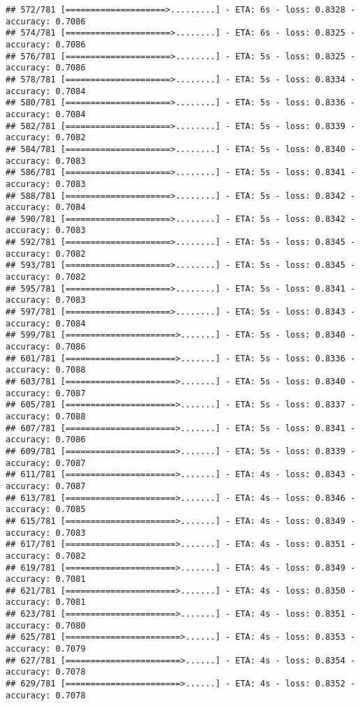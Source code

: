 \documentclass[
]{article}
\begin{document}
\begin{verbatim}
## 572/781 [====================>.........] - ETA: 6s - loss: 0.8328 - accuracy: 0.7086
## 574/781 [=====================>........] - ETA: 6s - loss: 0.8325 - accuracy: 0.7086
## 576/781 [=====================>........] - ETA: 5s - loss: 0.8325 - accuracy: 0.7086
## 578/781 [=====================>........] - ETA: 5s - loss: 0.8334 - accuracy: 0.7084
## 580/781 [=====================>........] - ETA: 5s - loss: 0.8336 - accuracy: 0.7084
## 582/781 [=====================>........] - ETA: 5s - loss: 0.8339 - accuracy: 0.7082
## 584/781 [=====================>........] - ETA: 5s - loss: 0.8340 - accuracy: 0.7083
## 586/781 [=====================>........] - ETA: 5s - loss: 0.8341 - accuracy: 0.7083
## 588/781 [=====================>........] - ETA: 5s - loss: 0.8342 - accuracy: 0.7084
## 590/781 [=====================>........] - ETA: 5s - loss: 0.8342 - accuracy: 0.7083
## 592/781 [=====================>........] - ETA: 5s - loss: 0.8345 - accuracy: 0.7082
## 593/781 [=====================>........] - ETA: 5s - loss: 0.8345 - accuracy: 0.7082
## 595/781 [=====================>........] - ETA: 5s - loss: 0.8341 - accuracy: 0.7083
## 597/781 [=====================>........] - ETA: 5s - loss: 0.8343 - accuracy: 0.7084
## 599/781 [======================>.......] - ETA: 5s - loss: 0.8340 - accuracy: 0.7086
## 601/781 [======================>.......] - ETA: 5s - loss: 0.8336 - accuracy: 0.7088
## 603/781 [======================>.......] - ETA: 5s - loss: 0.8340 - accuracy: 0.7087
## 605/781 [======================>.......] - ETA: 5s - loss: 0.8337 - accuracy: 0.7088
## 607/781 [======================>.......] - ETA: 5s - loss: 0.8341 - accuracy: 0.7086
## 609/781 [======================>.......] - ETA: 5s - loss: 0.8339 - accuracy: 0.7087
## 611/781 [======================>.......] - ETA: 4s - loss: 0.8343 - accuracy: 0.7087
## 613/781 [======================>.......] - ETA: 4s - loss: 0.8346 - accuracy: 0.7085
## 615/781 [======================>.......] - ETA: 4s - loss: 0.8349 - accuracy: 0.7083
## 617/781 [======================>.......] - ETA: 4s - loss: 0.8351 - accuracy: 0.7082
## 619/781 [======================>.......] - ETA: 4s - loss: 0.8349 - accuracy: 0.7081
## 621/781 [======================>.......] - ETA: 4s - loss: 0.8350 - accuracy: 0.7081
## 623/781 [======================>.......] - ETA: 4s - loss: 0.8351 - accuracy: 0.7080
## 625/781 [=======================>......] - ETA: 4s - loss: 0.8353 - accuracy: 0.7079
## 627/781 [=======================>......] - ETA: 4s - loss: 0.8354 - accuracy: 0.7078
## 629/781 [=======================>......] - ETA: 4s - loss: 0.8352 - accuracy: 0.7078

\end{verbatim}
\end{document}
